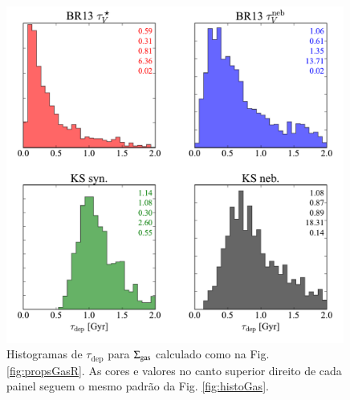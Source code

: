 \begin{figure}
	\centering
	\includegraphics[width=0.99\textwidth]{figuras/histo_tdep.pdf}
	\caption[Tempo de depleção do gás.]
	{Histogramas de $\tau_{\mathrm{dep}}$ para $\Sigma_{\mathrm{gas}}$ calculado como na Fig. \ref{fig:propsGasR}.
As cores e valores no canto superior direito de cada painel seguem o mesmo padrão da Fig. \ref{fig:histoGas}.}
	\label{fig:tdep}
\end{figure}


